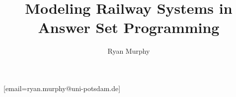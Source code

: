 \documentclass[]{include/latex-class-ceurart/ceurart}
\begin{document}

\title{Modeling Railway Systems in Answer Set Programming}

\author[1]{Ryan Murphy}[email=ryan.murphy@uni-potsdam.de]
\address[1]{University of Potsdam, Germany}

\maketitle








\appendix
%
%
%

\end{document}
